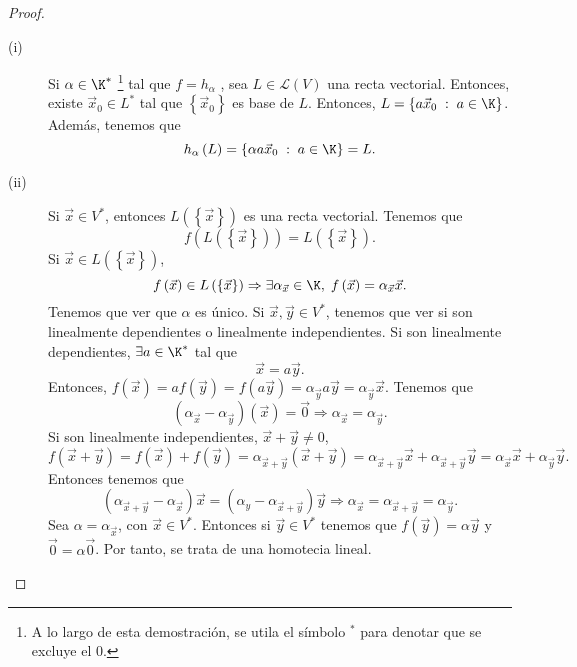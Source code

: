 \begin{proof}
\begin{description}
	\item[(i)] Si $\displaystyle \alpha \in \K^{*} $ \footnote{A lo largo de esta demostración, se utila el símbolo $\displaystyle ^{*} $ para denotar que se excluye el 0.} tal que $\displaystyle f = h_{\alpha} $ , sea $\displaystyle L \in \mathcal{L}\left(V\right) $ una recta vectorial. Entonces, existe $\displaystyle \vec{x}_{0} \in L^{*}$ tal que $\displaystyle \left\{ \vec{x}_{0}\right\}  $ es base de $\displaystyle L $. Entonces, $\displaystyle L = \left\{ a\vec{x}_{0} \; : \; a \in \K\right\}  $. Además, tenemos que 
		\[h_{\alpha }\left(L\right) = \left\{ \alpha a \vec{x}_{0}\; : \; a \in \K \right\} = L .\]
	\item[(ii)] Si $\displaystyle  \vec{x} \in V^{*} $, entonces $\displaystyle L\left( \left\{ \vec{x}\right\} \right)  $ es una recta vectorial. Tenemos que
		\[f\left(L\left( \left\{ \vec{x}\right\} \right)\right) = L\left( \left\{ \vec{x}\right\} \right) .\]
		Si $\displaystyle \vec{x} \in L\left( \left\{ \vec{x}\right\} \right) $, 
		\[f\left(\vec{x}\right) \in L\left( \left\{ \vec{x}\right\} \right) \Rightarrow \exists \alpha_{\vec{x}} \in \K, \; f\left(\vec{x}\right) = \alpha_{\vec{x}}\vec{x} .\]
Tenemos que ver que $\displaystyle \alpha  $ es único. Si $\displaystyle \vec{x}, \vec{y} \in V^{*} $, tenemos que ver si son linealmente dependientes o linealmente independientes. Si son linealmente dependientes, $\displaystyle \exists a \in \K^{*} $ tal que 
\[\vec{x} = a \vec{y} .\]
Entonces, $\displaystyle f\left(\vec{x}\right) = a f\left(\vec{y}\right) = f\left(a\vec{y}\right) = \alpha_{\vec{y}} a \vec{y} = \alpha_{\vec{y}}\vec{x} $. Tenemos que
\[\left(\alpha_{\vec{x}}-\alpha_{\vec{y}}\right)\left(\vec{x}\right) = \vec{0} \Rightarrow \alpha_{\vec{x}}= \alpha_{\vec{y}} .\]
Si son linealmente independientes, $\displaystyle \vec{x} + \vec{y} \neq 0 $, 
\[f\left(\vec{x}+ \vec{y}\right) = f\left(\vec{x}\right) + f\left(\vec{y}\right) = \alpha_{\vec{x}+\vec{y}}\left(\vec{x}+\vec{y}\right) = \alpha_{\vec{x}+\vec{y}}\vec{x} + \alpha_{\vec{x}+\vec{y}}\vec{y} = \alpha_{\vec{x}}\vec{x}+\alpha_{\vec{y}}\vec{y} .\]
Entonces tenemos que
\[\left(\alpha_{\vec{x}+\vec{y}}-\alpha_{ \vec{x}}\right)\vec{x} = \left(\alpha_{y}-\alpha_{\vec{x}+\vec{y}}\right) \vec{y} \Rightarrow \alpha_{\vec{x}} = \alpha_{\vec{x}+\vec{y}} = \alpha_{\vec{y}} .\]
Sea $\displaystyle \alpha = \alpha_{\vec{x}} $, con $\displaystyle \vec{x} \in V^{*} $. Entonces si $\displaystyle \vec{y} \in V^{*} $ tenemos que $\displaystyle f\left(\vec{y}\right) = \alpha\vec{y} $ y $\displaystyle \vec{0} = \alpha \vec{0} $. Por tanto, se trata de una homotecia lineal.
\end{description}
\end{proof}

